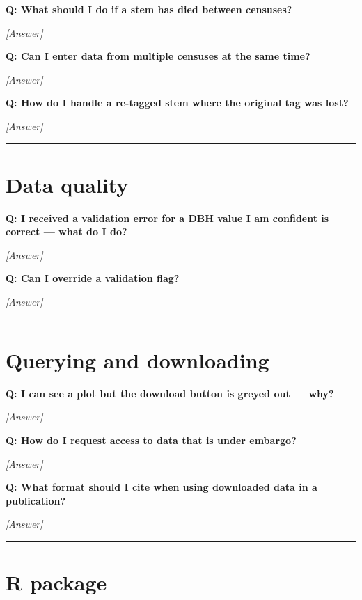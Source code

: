 \documentclass[
]{book}
\begin{document}
\textbf{Q: What should I do if a stem has died between censuses?}

\emph{{[}Answer{]}}

\textbf{Q: Can I enter data from multiple censuses at the same time?}

\emph{{[}Answer{]}}

\textbf{Q: How do I handle a re-tagged stem where the original tag was lost?}

\emph{{[}Answer{]}}

\begin{center}\rule{0.5\linewidth}{0.5pt}\end{center}

\section{Data quality}\label{data-quality-1}

\textbf{Q: I received a validation error for a DBH value I am confident is correct --- what do I do?}

\emph{{[}Answer{]}}

\textbf{Q: Can I override a validation flag?}

\emph{{[}Answer{]}}

\begin{center}\rule{0.5\linewidth}{0.5pt}\end{center}

\section{Querying and downloading}\label{querying-and-downloading}

\textbf{Q: I can see a plot but the download button is greyed out --- why?}

\emph{{[}Answer{]}}

\textbf{Q: How do I request access to data that is under embargo?}

\emph{{[}Answer{]}}

\textbf{Q: What format should I cite when using downloaded data in a publication?}

\emph{{[}Answer{]}}

\begin{center}\rule{0.5\linewidth}{0.5pt}\end{center}

\section{R package}\label{r-package-1}
\end{document}
